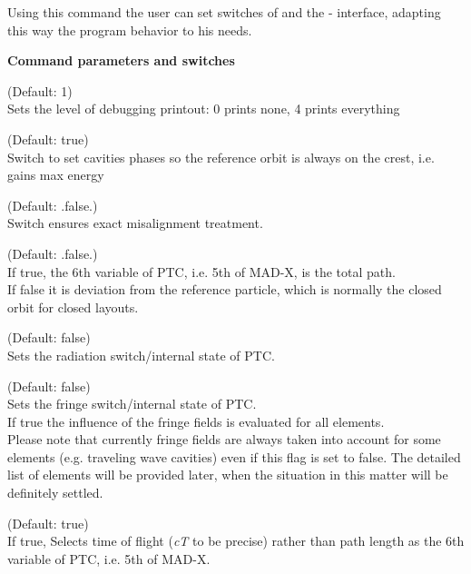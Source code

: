 Using this command the user can set switches of \ptc and the {\madx}-{\ptc}
interface, adapting this way the program behavior to his needs.   

{\bf Command parameters and switches}
\begin{madlist}
    (Default: 1)\\
     Sets the level of debugging printout: 0 prints none, 4 prints everything   

    (Default: true)\\
     Switch to set cavities phases so the reference orbit is always on
     the crest, i.e. gains max energy    

    (Default: .false.)\\
     Switch ensures exact misalignment treatment.   

    (Default: .false.)\\
     If true, the 6th variable of PTC, i.e. 5th of MAD-X, is the total
     path.  \\
     If false it is deviation from the reference particle,
     which is normally the closed orbit for closed layouts.    

    (Default: false)\\    
     Sets the radiation switch/internal state of PTC.   

    (Default: false)\\    
     Sets the fringe switch/internal state of PTC. \\ 
     If true the influence of the fringe fields is evaluated for all
     elements. \\       
     Please note that currently fringe fields are always taken into
     account for some elements (e.g. traveling wave cavities) even if
     this flag is set to false. The detailed list of elements
     will be provided later, when the situation in this matter will be
     definitely settled.    

    (Default: true)\\  
     If true, Selects time of flight (\textit{cT} to be precise) rather
     than path length as the 6th variable of PTC, i.e. 5th of MAD-X.     

\end{madlist}


